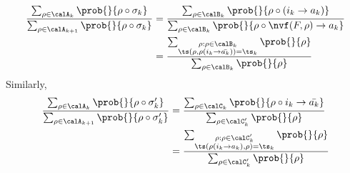 
%
       
       
    
     
    \begin{align*}
        \frac{\sum_{\rho \in \calA_k}\prob{}{\rho\circ \sigma_k}}{\sum_{\rho \in \calA_{k+1}}\prob{}{\rho\circ \sigma_k}}
        &= \frac{\sum_{\rho \in \calB_k} \prob{}{\rho \circ (i_k \to a_k)}}{\sum_{\rho \in \calB_k} \prob{}{\rho \circ \nvf(F,\rho) \to a_k}}\\
        &= \frac{\sum_{\substack{\rho:\rho \in \calB_k\\ \ts(\rho, \rho(i_k \to \bar{a_k}))= \ts_k }} \prob{}{\rho}}{\sum_{\rho \in \calB_k} \prob{}{\rho}}
    \end{align*}
    Similarly,
    \begin{align*}
        \frac{\sum_{\rho \in \calA_k}\prob{}{\rho\circ \sigma_k'}}{\sum_{\rho \in \calA_{k+1}}\prob{}{\rho\circ \sigma_k'}}
        &= \frac{\sum_{\rho \in \calC_k} \prob{}{\rho \circ {i_k \to \bar{a_k}}}}{\sum_{\rho \in \calC_k'} \prob{}{\rho}}\\
        &= \frac{\sum_{\substack{\rho:\rho \in \calC_k'\\ \ts(\rho(i_k \to a_k), \rho)= \ts_k }} \prob{}{\rho}}{\sum_{\rho \in \calC_k'} \prob{}{\rho}}
    \end{align*}